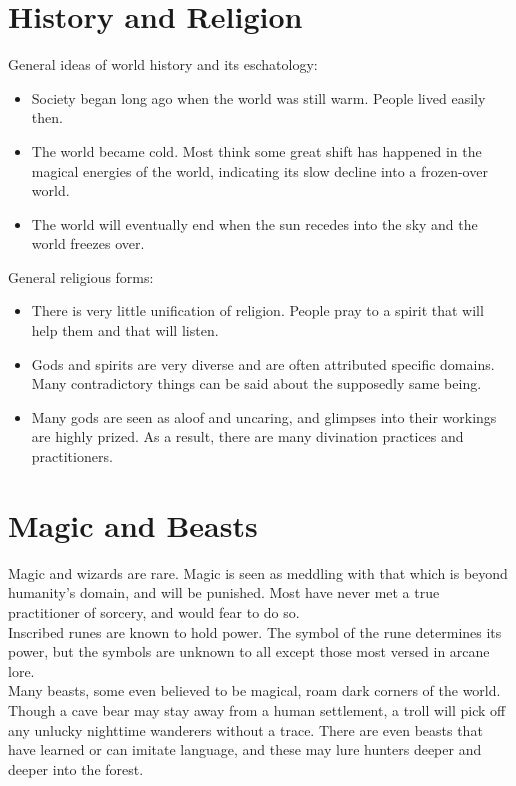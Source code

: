 \documentclass[a4paper]{article}
\begin{document}
\begin{multicols}{2}
\section{History and Religion}

General ideas of world history and its eschatology:

\begin{itemize}
\item Society began long ago when the world was still warm. People lived easily then.
\item The world became cold. Most think some great shift has happened in the magical energies of the world, indicating its slow decline into a frozen-over world.
\item The world will eventually end when the sun recedes into the sky and the world freezes over.
\end{itemize}

General religious forms:

\begin{itemize}
\item There is very little unification of religion. People pray to a spirit that will help them and that will listen.
\item Gods and spirits are very diverse and are often attributed specific domains. Many contradictory things can be said about the supposedly same being.
\item Many gods are seen as aloof and uncaring, and glimpses into their workings are highly prized. As a result, there are many divination practices and practitioners.
\end{itemize}

\section{Magic and Beasts}

Magic and wizards are rare. Magic is seen as meddling with that which is beyond humanity's domain, and will be punished. Most have never met a true practitioner of sorcery, and would fear to do so. \\

Inscribed runes are known to hold power. The symbol of the rune determines its power, but the symbols are unknown to all except those most versed in arcane lore. \\

Many beasts, some even believed to be magical, roam dark corners of the world. Though a cave bear may stay away from a human settlement, a troll will pick off any unlucky nighttime wanderers without a trace. There are even beasts that have learned or can imitate language, and these may lure hunters deeper and deeper into the forest. \\


\end{multicols}
\end{document}
